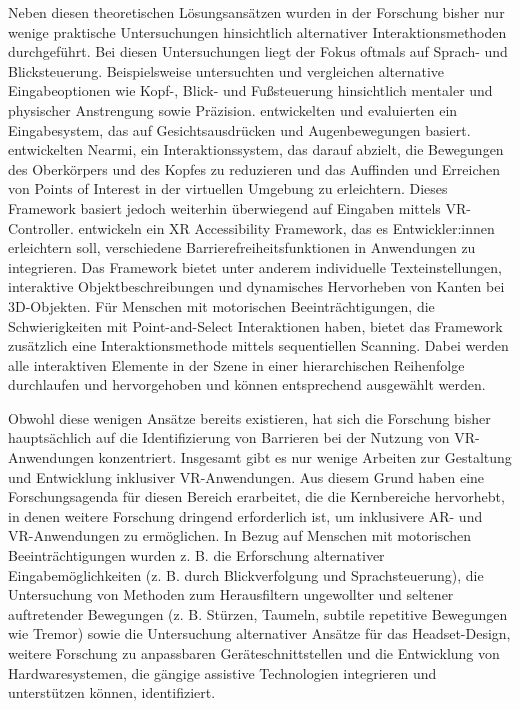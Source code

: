 Neben diesen theoretischen Lösungsansätzen wurden in der Forschung bisher nur wenige praktische Untersuchungen hinsichtlich alternativer Interaktionsmethoden durchgeführt. Bei diesen Untersuchungen liegt der Fokus oftmals auf Sprach- und Blicksteuerung. Beispielsweise untersuchten und vergleichen \citet{minakata_pointing_2019} alternative Eingabeoptionen wie Kopf-, Blick- und Fußsteuerung hinsichtlich mentaler und physischer Anstrengung sowie Präzision. \citet{wang_intelligent_2018} entwickelten und evaluierten ein Eingabesystem, das auf Gesichtsausdrücken und Augenbewegungen basiert. \citet{10.1145/3441852.3471230} entwickelten Nearmi, ein Interaktionssystem, das darauf abzielt, die Bewegungen des Oberkörpers und des Kopfes zu reduzieren und das Auffinden und Erreichen von Points of Interest in der virtuellen Umgebung zu erleichtern. Dieses Framework basiert jedoch weiterhin überwiegend auf Eingaben mittels VR-Controller. \citet{valakou_framework_2024} entwickeln ein XR Accessibility Framework, das es Entwickler:innen erleichtern soll, verschiedene Barrierefreiheitsfunktionen in Anwendungen zu integrieren. Das Framework bietet unter anderem individuelle Texteinstellungen, interaktive Objektbeschreibungen und dynamisches Hervorheben von Kanten bei 3D-Objekten. Für Menschen mit motorischen Beeinträchtigungen, die Schwierigkeiten mit Point-and-Select Interaktionen haben, bietet das Framework zusätzlich eine Interaktionsmethode mittels sequentiellen Scanning. Dabei werden alle interaktiven Elemente in der Szene in einer hierarchischen Reihenfolge durchlaufen und hervorgehoben und können entsprechend ausgewählt werden.

Obwohl diese wenigen Ansätze bereits existieren, hat sich die Forschung bisher hauptsächlich auf die Identifizierung von Barrieren bei der Nutzung von VR-Anwendungen konzentriert. Insgesamt gibt es nur wenige Arbeiten zur Gestaltung und Entwicklung inklusiver VR-Anwendungen. Aus diesem Grund haben \citet{creed_inclusive_2024_2} eine Forschungsagenda für diesen Bereich erarbeitet, die die Kernbereiche hervorhebt, in denen weitere Forschung dringend erforderlich ist, um inklusivere AR- und VR-Anwendungen zu ermöglichen. In Bezug auf Menschen mit motorischen Beeinträchtigungen wurden z. B. die Erforschung alternativer Eingabemöglichkeiten (z. B. durch Blickverfolgung und Sprachsteuerung), die Untersuchung von Methoden zum Herausfiltern ungewollter und seltener auftretender Bewegungen (z. B. Stürzen, Taumeln, subtile repetitive Bewegungen wie Tremor) sowie die Untersuchung alternativer Ansätze für das Headset-Design, weitere Forschung zu anpassbaren Geräteschnittstellen und die Entwicklung von Hardwaresystemen, die gängige assistive Technologien integrieren und unterstützen können, identifiziert.

